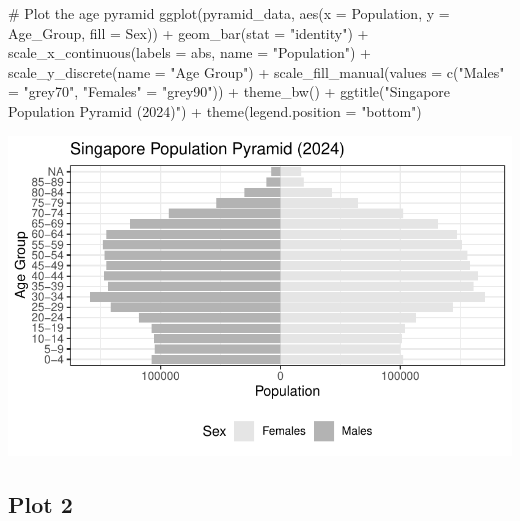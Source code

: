 \documentclass[
  letterpaper,
  DIV=11,
  numbers=noendperiod]{scrartcl}
\newenvironment{Shaded}{\begin{snugshade}}{\end{snugshade}}
\newcommand{\AttributeTok}[1]{\textcolor[rgb]{0.40,0.45,0.13}{#1}}
\newcommand{\CommentTok}[1]{\textcolor[rgb]{0.37,0.37,0.37}{#1}}
\newcommand{\FunctionTok}[1]{\textcolor[rgb]{0.28,0.35,0.67}{#1}}
\newcommand{\NormalTok}[1]{\textcolor[rgb]{0.00,0.23,0.31}{#1}}
\newcommand{\OtherTok}[1]{\textcolor[rgb]{0.00,0.23,0.31}{#1}}
\newcommand{\SpecialCharTok}[1]{\textcolor[rgb]{0.37,0.37,0.37}{#1}}
\newcommand{\StringTok}[1]{\textcolor[rgb]{0.13,0.47,0.30}{#1}}
\begin{document}
\begin{Shaded}
\begin{Highlighting}[]
\CommentTok{\# Plot the age pyramid}
\FunctionTok{ggplot}\NormalTok{(pyramid\_data, }\FunctionTok{aes}\NormalTok{(}\AttributeTok{x =}\NormalTok{ Population, }\AttributeTok{y =}\NormalTok{ Age\_Group, }\AttributeTok{fill =}\NormalTok{ Sex)) }\SpecialCharTok{+}
  \FunctionTok{geom\_bar}\NormalTok{(}\AttributeTok{stat =} \StringTok{"identity"}\NormalTok{) }\SpecialCharTok{+}
  \FunctionTok{scale\_x\_continuous}\NormalTok{(}\AttributeTok{labels =}\NormalTok{ abs, }\AttributeTok{name =} \StringTok{"Population"}\NormalTok{) }\SpecialCharTok{+}
  \FunctionTok{scale\_y\_discrete}\NormalTok{(}\AttributeTok{name =} \StringTok{"Age Group"}\NormalTok{) }\SpecialCharTok{+}
  \FunctionTok{scale\_fill\_manual}\NormalTok{(}\AttributeTok{values =} \FunctionTok{c}\NormalTok{(}\StringTok{"Males"} \OtherTok{=} \StringTok{"grey70"}\NormalTok{, }\StringTok{"Females"} \OtherTok{=} \StringTok{"grey90"}\NormalTok{)) }\SpecialCharTok{+}
  \FunctionTok{theme\_bw}\NormalTok{() }\SpecialCharTok{+}
  \FunctionTok{ggtitle}\NormalTok{(}\StringTok{"Singapore Population Pyramid (2024)"}\NormalTok{) }\SpecialCharTok{+}
  \FunctionTok{theme}\NormalTok{(}\AttributeTok{legend.position =} \StringTok{"bottom"}\NormalTok{)}
\end{Highlighting}
\end{Shaded}

\includegraphics{Take-home_Ex01_files/figure-pdf/unnamed-chunk-9-1.pdf}

\subsection{Plot 2}\label{plot-2-1}
\end{document}
